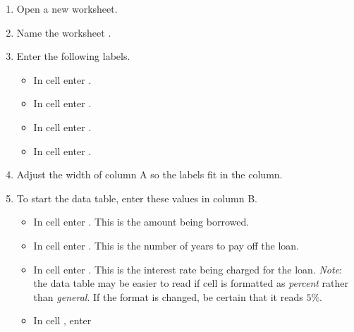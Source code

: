 \begin{enumerate}
	\item Open a new worksheet.
	\item Name the worksheet .
	\item Enter the following labels.
	
	\begin{itemize}
		\item In cell  enter .
		\item In cell  enter .
		\item In cell  enter .
		\item In cell  enter .
	\end{itemize}

	\item Adjust the width of column A so the labels fit in the column.
	\item To start the data table, enter these values in column B.
	
	\begin{itemize}
		\item In cell  enter . This is the amount being borrowed.
		\item In cell  enter . This is the number of years to pay off the loan.
		\item In cell  enter . This is the interest rate being charged for the loan. \textit{Note}: the data table may be easier to read if cell  is formatted as \textit{percent} rather than \textit{general}. If the format is changed, be certain that it reads $ 5\% $.
		\item In cell , enter 
	\end{itemize}


\end{enumerate}
